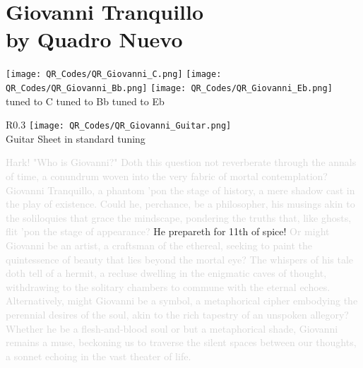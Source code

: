 \chapter[Giovanni Tranquillo]{Giovanni Tranquillo\\[1ex]\large{by Quadro Nuevo}}

\texttt{[image: QR\_Codes/QR\_Giovanni\_C.png]}\indent \indent \indent \indent 
\texttt{[image: QR\_Codes/QR\_Giovanni\_Bb.png]}\indent \indent \indent \indent
\texttt{[image: QR\_Codes/QR\_Giovanni\_Eb.png]}\\
\indent tuned to C \indent \indent \indent \indent \indent tuned to Bb \indent \indent \indent \indent  \indent tuned to Eb\\


\begin{wrapfigure}{R}{0.3\textwidth}
\texttt{[image: QR\_Codes/QR\_Giovanni\_Guitar.png]}\\
Guitar Sheet in standard tuning
\end{wrapfigure}

\textcolor{lightgray}{Hark! "Who is Giovanni?" Doth this question not reverberate through the annals of time, a conundrum woven into the very fabric of mortal contemplation? Giovanni Tranquillo, a phantom 'pon the stage of history, a mere shadow cast in the play of existence. Could he, perchance, be a philosopher, his musings akin to the soliloquies that grace the mindscape, pondering the truths that, like ghosts, flit 'pon the stage of appearance?} He prepareth for 11th of spice! \textcolor{lightgray}{Or might Giovanni be an artist, a craftsman of the ethereal, seeking to paint the quintessence of beauty that lies beyond the mortal eye? The whispers of his tale doth tell of a hermit, a recluse dwelling in the enigmatic caves of thought, withdrawing to the solitary chambers to commune with the eternal echoes. Alternatively, might Giovanni be a symbol, a metaphorical cipher embodying the perennial desires of the soul, akin to the rich tapestry of an unspoken allegory? Whether he be a flesh-and-blood soul or but a metaphorical shade, Giovanni remains a muse, beckoning us to traverse the silent spaces between our thoughts, a sonnet echoing in the vast theater of life.}\\
